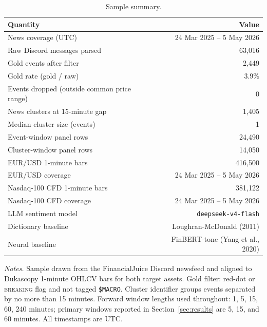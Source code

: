 \begin{table}[!htbp]
\centering
\caption{Sample summary.}
\label{tab:sample-summary}
\begin{threeparttable}
\begin{tabular}{lr}
\toprule
\textbf{Quantity} & \textbf{Value} \\
\midrule
News coverage (UTC)                              & 24 Mar 2025 -- 5 May 2026 \\
Raw Discord messages parsed                      & 63{,}016 \\
Gold events after filter                         & 2{,}449 \\
Gold rate (gold / raw)                           & 3.9\% \\
Events dropped (outside common price range)      & 0 \\
News clusters at 15-minute gap                   & 1{,}405 \\
Median cluster size (events)                     & 1 \\
Event-window panel rows                          & 24{,}490 \\
Cluster-window panel rows                        & 14{,}050 \\
\addlinespace
EUR/USD 1-minute bars                            & 416{,}500 \\
EUR/USD coverage                                 & 24 Mar 2025 -- 5 May 2026 \\
Nasdaq-100 CFD 1-minute bars                     & 381{,}122 \\
Nasdaq-100 CFD coverage                          & 24 Mar 2025 -- 5 May 2026 \\
\addlinespace
LLM sentiment model                              & \texttt{deepseek-v4-flash} \\
Dictionary baseline                              & Loughran-McDonald (2011) \\
Neural baseline                                  & FinBERT-tone (Yang et al., 2020) \\
\bottomrule
\end{tabular}
\begin{tablenotes}
\footnotesize
\item \textit{Notes.} Sample drawn from the FinancialJuice Discord
newsfeed and aligned to Dukascopy 1-minute OHLCV bars for both
target assets. Gold filter: red-dot or \textsc{breaking} flag and
not tagged \texttt{\$MACRO}. Cluster identifier groups events
separated by no more than 15 minutes. Forward window lengths used
throughout: 1, 5, 15, 60, 240 minutes; primary windows reported in
Section~\ref{sec:results} are 5, 15, and 60 minutes. All
timestamps are UTC.
\end{tablenotes}
\end{threeparttable}
\end{table}
